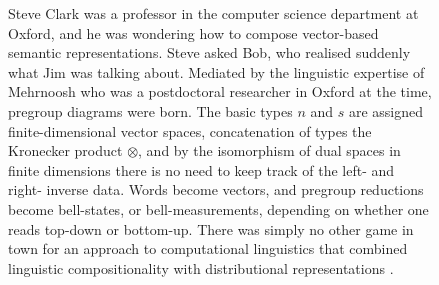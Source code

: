 \begin{figure}[h!]
\centering
{}
\caption{Steve Clark was a professor in the computer science department at Oxford, and he was wondering how to compose vector-based semantic representations. Steve asked Bob, who realised suddenly what Jim was talking about. Mediated by the linguistic expertise of Mehrnoosh who was a postdoctoral researcher in Oxford at the time, pregroup diagrams were born. The basic types $n$ and $s$ are assigned finite-dimensional vector spaces, concatenation of types the Kronecker product $\otimes$, and by the isomorphism of dual spaces in finite dimensions there is no need to keep track of the left- and right- inverse data. Words become vectors, and pregroup reductions become bell-states, or bell-measurements, depending on whether one reads top-down or bottom-up. There was simply no other game in town for an approach to computational linguistics that combined linguistic compositionality with distributional representations \citep{coeckeMathematicalFoundationsCompositional2010a}.}
\end{figure}

